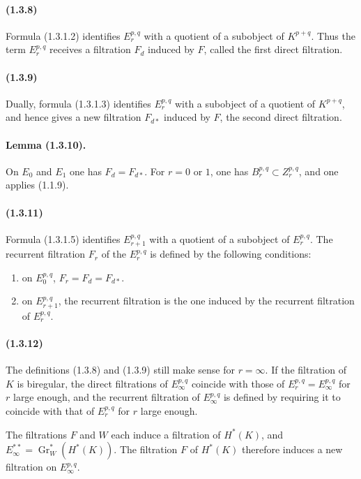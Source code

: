 \documentclass[10pt]{article}
\newcommand{\Gr}{\operatorname{Gr}}
\begin{document}
\paragraph{(1.3.8)} Formula (1.3.1.2) identifies $E_r^{p,q}$ with a quotient of a subobject of $K^{p+q}$. Thus the term $E_r^{p,q}$ receives a filtration $F_d$ induced by $F$, called the first direct filtration.

\paragraph{(1.3.9)} Dually, formula (1.3.1.3) identifies $E_r^{p,q}$ with a subobject of a quotient of $K^{p+q}$, and hence gives a new filtration $F_{d*}$ induced by $F$, the second direct filtration.

\paragraph{Lemma (1.3.10).} On $E_0$ and $E_1$ one has $F_d=F_{d*}$. For $r=0$ or $1$, one has $B_r^{p,q}\subset Z_r^{p,q}$, and one applies (1.1.9).

\paragraph{(1.3.11)} Formula (1.3.1.5) identifies $E_{r+1}^{p,q}$ with a quotient of a subobject of $E_r^{p,q}$. The recurrent filtration $F_r$ of the $E_r^{p,q}$ is defined by the following conditions:
\begin{enumerate}[label=(\roman*)]
\item on $E_0^{p,q}$, $F_r=F_d=F_{d*}$.
\item on $E_{r+1}^{p,q}$, the recurrent filtration is the one induced by the recurrent filtration of $E_r^{p,q}$.
\end{enumerate}

\paragraph{(1.3.12)} The definitions (1.3.8) and (1.3.9) still make sense for $r=\infty$. If the filtration of $K$ is biregular, the direct filtrations of $E_\infty^{p,q}$ coincide with those of $E_r^{p,q}=E_\infty^{p,q}$ for $r$ large enough, and the recurrent filtration of $E_\infty^{p,q}$ is defined by requiring it to coincide with that of $E_r^{p,q}$ for $r$ large enough.

The filtrations $F$ and $W$ each induce a filtration of $H^*(K)$, and $E_\infty^{**}=\Gr_W^*(H^*(K))$. The filtration $F$ of $H^*(K)$ therefore induces a new filtration on $E_\infty^{p,q}$.
\end{document}
